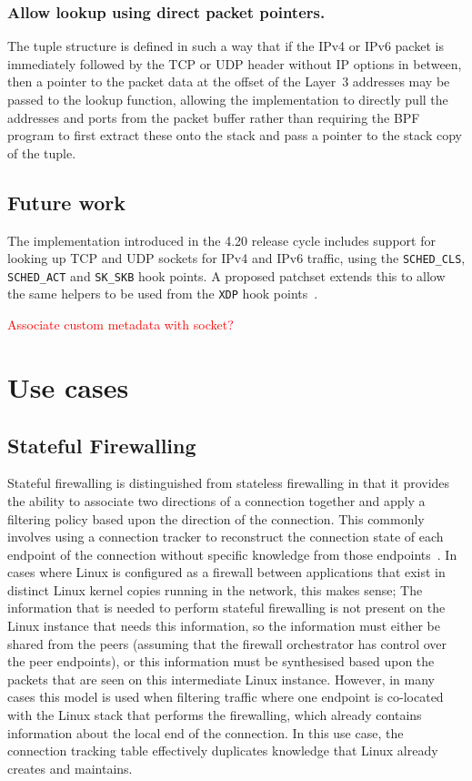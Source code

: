 \documentclass[10pt,sigconf,authorversion]{lpc}
\newcommand\todo[1]{\textcolor{red}{#1}}
\begin{document}
\subsubsection{Allow lookup using direct packet pointers.}

The tuple structure is defined in such a way that if the IPv4 or IPv6 packet is
immediately followed by the TCP or UDP header without IP options in between,
then a pointer to the packet data at the offset of the Layer~3 addresses may be
passed to the lookup function, allowing the implementation to directly pull the
addresses and ports from the packet buffer rather than requiring the BPF
program to first extract these onto the stack and pass a pointer to the stack
copy of the tuple.

\subsection{Future work}

The implementation introduced in the 4.20 release cycle includes support for
looking up TCP and UDP sockets for IPv4 and IPv6 traffic, using the
\verb+SCHED_CLS+, \verb+SCHED_ACT+ and \verb+SK_SKB+ hook points. A proposed
patchset extends this to allow the same helpers to be used from the \verb+XDP+
hook points~\cite{sk-lookup-xdp}.

\todo{Associate custom metadata with socket?}

\section{Use cases}

\subsection{Stateful Firewalling}

Stateful firewalling is distinguished from stateless firewalling in that it
provides the ability to associate two directions of a connection together and
apply a filtering policy based upon the direction of the connection. This
commonly involves using a connection tracker to reconstruct the connection
state of each endpoint of the connection without specific knowledge from those
endpoints~\cite{conntrack,ovs-ct}. In cases where Linux is configured as a
firewall between applications that exist in distinct Linux kernel copies
running in the network, this makes sense; The information that is needed to
perform stateful firewalling is not present on the Linux instance that needs
this information, so the information must either be shared from the peers
(assuming that the firewall orchestrator has control over the peer endpoints),
or this information must be synthesised based upon the packets that are seen on
this intermediate Linux instance. However, in many cases this model is used
when filtering traffic where one endpoint is co-located with the Linux stack
that performs the firewalling, which already contains information about the
local end of the connection. In this use case, the connection tracking table
effectively duplicates knowledge that Linux already creates and maintains.
\end{document}
